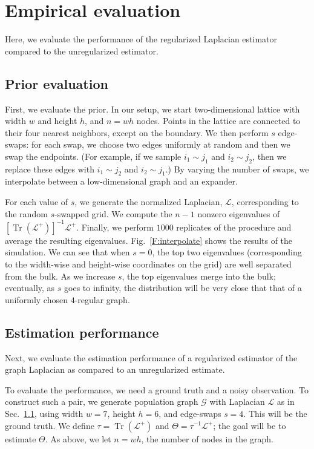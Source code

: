 \documentclass[12pt]{article}
\DeclareMathOperator*{\Tr}{Tr}
\theoremstyle{plain}
\begin{document}
\section{Empirical evaluation}
\label{sxn:empirical}

Here, we evaluate the performance of the regularized Laplacian
estimator compared to the unregularized estimator.

\subsection{Prior evaluation}\label{S:prior-evaluation}

First, we evaluate the prior.  In our setup, we start two-dimensional
lattice with width $w$ and height $h$, and $n = w h$ nodes.  Points in
the lattice are connected to their four nearest neighbors, except on
the boundary.  We then perform $s$ edge-swaps: for each swap, we
choose two edges uniformly at random and then we swap the endpoints.
(For example, if we sample $i_1 \sim j_1$ and $i_2 \sim j_2$, then we
replace these edges with $i_1 \sim j_2$ and $i_2 \sim j_1$.)  By
varying the number of swaps, we interpolate between a low-dimensional
graph and an expander.

For each value of $s$, we generate the normalized Laplacian, $\mathcal{L}$,
corresponding to the random $s$-swapped grid.  We compute the $n-1$ nonzero
eigenvalues of $[\Tr(\mathcal{L}^{+})]^{-1} \mathcal{L}^{+}$.
Finally, we perform $1000$ replicates of the procedure and average the
resulting eigenvalues.  Fig.~\ref{F:interpolate} shows the results of
the simulation.  We can see that when $s = 0$, the top two eigenvalues
(corresponding to the width-wise and height-wise coordinates on the grid)
are well separated from the bulk.  As we increase $s$, the top eigenvalues
merge into the bulk; eventually, as $s$ goes to infinity, the
distribution will be very close that that of a uniformly chosen
$4$-regular graph.


\subsection{Estimation performance}\label{S:estimation}

Next, we evaluate the estimation performance of a regularized
estimator of the graph Laplacian as compared to an unregularized
estimate.

To evaluate the performance, we need a ground truth and a noisy
observation.  To construct such a pair, we generate population graph
$\mathcal{G}$ with Laplacian $\mathcal{L}$ as in
Sec.~\ref{S:prior-evaluation}, using width $w = 7$, height $h = 6$,
and edge-swaps $s = 4$.  This will be the ground truth.  We define
$\tau = \Tr(\mathcal{L}^+)$ and $\Theta = \tau^{-1} \mathcal{L}^+$;
the goal will be to estimate $\Theta$.  As above, we let $n = w h$,
the number of nodes in the graph.
\end{document}
